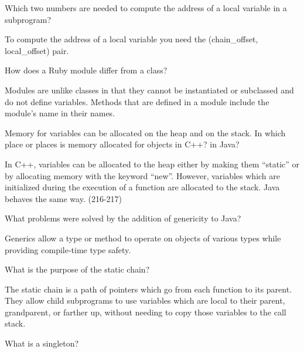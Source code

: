 \begin{enumerate}
\begin{answer}
\begin{answer}
  \item Which two numbers are needed to compute
    the address of a local variable in a subprogram?

\begin{answer}
    To compute the address of a local variable you need the (chain_offset, local_offset) pair.
    \end{answer}


  \item How does a Ruby module differ from a class?

    \begin{answer}
    Modules are unlike classes in that they cannot be instantiated or subclassed and do not define variables. Methods that are defined in a module include the  module’s name in their names.
    \end{answer}

  \item Memory for variables can be allocated on the heap
    and on the stack. In which place or places is memory
    allocated for objects in C++? in Java?

   \begin{answer}
    In C++, variables can be allocated to the heap either by making them “static” or by allocating memory with the keyword “new”. However, variables which are initialized during the execution of a function are allocated to the stack. Java behaves the same way. (216-217)
    \end{answer}

  \item What problems were solved by the addition
    of genericity to Java?

   \begin{answer}
    Generics allow a type or method to operate on objects of various types while providing compile-time type safety.
    \end{answer}

  \item What is the purpose of the static chain?

    \begin{answer}
    The static chain is a path of pointers which go from each function to its parent. They allow child subprograms to use variables which are local to their parent, grandparent, or farther up, without needing to copy those variables to the call stack.
    \end{answer}
  \item What is a singleton?


\end{answer}
\end{answer}
\end{enumerate}
